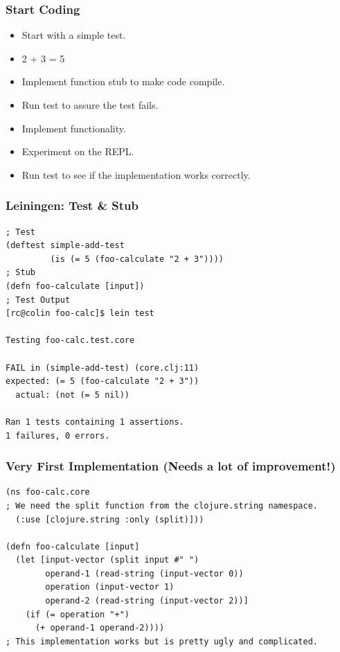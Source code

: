 \documentclass{beamer}
\begin{document}
  \begin{frame}
    \frametitle{Start Coding}
    \begin{itemize}
      \item Start with a simple test.
      \item 2 + 3 = 5
      \item Implement function stub to make code compile.
      \item Run test to assure the test fails.
      \item Implement functionality.
      \item Experiment on the REPL.
      \item Run test to see if the implementation works correctly.
    \end{itemize}
  \end{frame}

\begin{frame}[fragile]
\frametitle{Leiningen: Test \& Stub}
\begin{lstlisting}[basicstyle=\scriptsize]
; Test
(deftest simple-add-test
         (is (= 5 (foo-calculate "2 + 3"))))
; Stub
(defn foo-calculate [input])
; Test Output
[rc@colin foo-calc]$ lein test 
 
Testing foo-calc.test.core
 
FAIL in (simple-add-test) (core.clj:11)
expected: (= 5 (foo-calculate "2 + 3"))
  actual: (not (= 5 nil))

Ran 1 tests containing 1 assertions.
1 failures, 0 errors.
\end{lstlisting}
\end{frame}

\begin{frame}[fragile]
\frametitle{Very First Implementation (Needs a lot of improvement!)}
\begin{lstlisting}[basicstyle=\scriptsize]
(ns foo-calc.core
; We need the split function from the clojure.string namespace.
  (:use [clojure.string :only (split)]))

(defn foo-calculate [input]
  (let [input-vector (split input #" ")
        operand-1 (read-string (input-vector 0))
        operation (input-vector 1)
        operand-2 (read-string (input-vector 2))]
    (if (= operation "+")
      (+ operand-1 operand-2))))
; This implementation works but is pretty ugly and complicated.
\end{lstlisting}
\end{frame}
\end{document}
